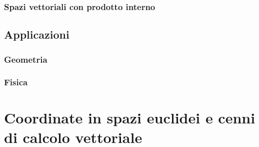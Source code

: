\begin{property}
\end{property}

\begin{definition}
\end{definition}


\subsection{Spazi vettoriali con prodotto interno}


\section{Applicazioni}
\subsection{Geometria}
\subsection{Fisica}


\chapter{Coordinate in spazi euclidei e cenni di calcolo vettoriale}
\begin{definition}
\end{definition}

\begin{definition}[Coordinate]
\end{definition}
\begin{example}
\end{example}
\begin{example}
\end{example}
\begin{example}
\end{example}

